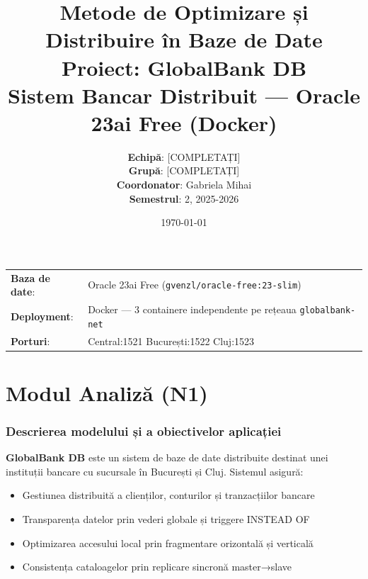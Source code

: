 \documentclass[12pt,a4paper]{article}
\title{
    \textbf{Metode de Optimizare și Distribuire în Baze de Date} \\[0.5em]
    \large Proiect: GlobalBank DB \\
    \normalsize Sistem Bancar Distribuit — Oracle 23ai Free (Docker)
}
\author{
    \textbf{Echipă}: [COMPLETAȚI] \\
    \textbf{Grupă}: [COMPLETAȚI] \\
    \textbf{Coordonator}: Gabriela Mihai \\
    \textbf{Semestrul}: 2, 2025-2026
}
\date{\today}
\begin{document}

\maketitle\thispagestyle{empty}

\begin{center}
\begin{tabular}{ll}
  \textbf{Baza de date}: & Oracle 23ai Free (\texttt{gvenzl/oracle-free:23-slim}) \\
  \textbf{Deployment}:   & Docker — 3 containere independente pe rețeaua \texttt{globalbank-net} \\
  \textbf{Porturi}:      & Central:1521 \quad București:1522 \quad Cluj:1523 \\
\end{tabular}
\end{center}

\newpage
\tableofcontents
\newpage

\part{Modul Analiză (N1)}

\section{Descrierea modelului și a obiectivelor aplicației}

\textbf{GlobalBank DB} este un sistem de baze de date distribuite destinat unei instituții bancare
cu sucursale în București și Cluj. Sistemul asigură:
\begin{itemize}
  \item Gestiunea distribuită a clienților, conturilor și tranzacțiilor bancare
  \item Transparența datelor prin vederi globale și triggere INSTEAD OF
  \item Optimizarea accesului local prin fragmentare orizontală și verticală
  \item Consistența cataloagelor prin replicare sincronă master→slave
\end{itemize}
\end{document}
